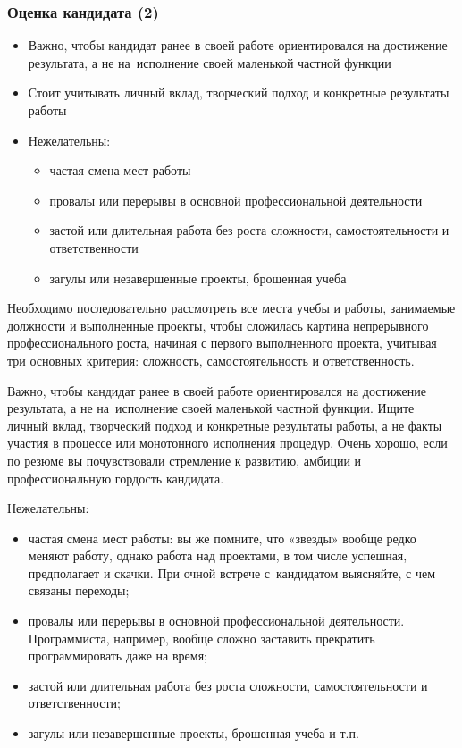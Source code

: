 \documentclass{../industrial-development}
\begin{document}
\begin{frame} \frametitle{Оценка кандидата (2)}
	\begin{itemize}
		
		\item Важно, чтобы кандидат ранее в своей работе ориентировался на достижение результата, а не на~исполнение своей маленькой частной функции
		\item Стоит учитывать личный вклад, творческий подход и конкретные результаты работы
		\item Нежелательны:
		\begin{itemize}
			\item частая смена мест работы
			\item	провалы или перерывы в основной профессиональной деятельности
			\item	застой или длительная работа без роста сложности, самостоятельности и ответственности
			\item загулы или незавершенные проекты, брошенная учеба
			
		\end{itemize}
	\end{itemize}
\end{frame}

\lecturenotes

Необходимо последовательно рассмотреть все места учебы и работы, занимаемые должности и выполненные проекты, чтобы сложилась картина непрерывного профессионального роста, начиная с первого выполненного проекта, учитывая три основных критерия: сложность, самостоятельность и ответственность.

Важно, чтобы кандидат ранее в своей работе ориентировался на достижение результата, а не на~исполнение своей маленькой частной функции. Ищите личный вклад, творческий подход и конкретные результаты работы, а не факты участия в процессе или монотонного исполнения процедур. Очень хорошо, если по резюме вы почувствовали стремление к развитию, амбиции и профессиональную гордость кандидата.

Нежелательны:
\begin{itemize}
	\item	частая смена мест работы: вы же помните, что «звезды» вообще редко меняют работу, однако работа над проектами, в том числе успешная, предполагает и скачки. При очной встрече с~кандидатом выясняйте, с чем связаны переходы;
	
	\item	провалы или перерывы в основной профессиональной деятельности. Программиста, например, вообще сложно заставить прекратить программировать даже на время;
	
	\item	застой или длительная работа без роста сложности, самостоятельности и ответственности;
	
	\item	загулы или незавершенные проекты, брошенная учеба и т.п.
\end{itemize}
\end{document}
